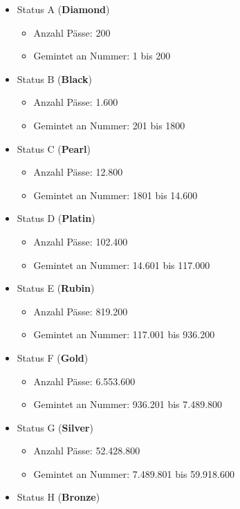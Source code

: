 \begin{NFT-Prop}
\begin{itemize}
    \item Status A (\textbf{Diamond})
    \begin{itemize}
    	\item Anzahl Pässe: 200
    	\item Gemintet an Nummer: 1 bis 200
    \end{itemize}
    \item Status B (\textbf{Black})
    \begin{itemize}
    	\item Anzahl Pässe: 1.600
    	\item Gemintet an Nummer: 201 bis 1800
    \end{itemize}
    \item Status C (\textbf{Pearl})
    \begin{itemize}
    	\item Anzahl Pässe: 12.800
    	\item Gemintet an Nummer: 1801 bis 14.600
    \end{itemize}
    \item Status D (\textbf{Platin})
    \begin{itemize}
    	\item Anzahl Pässe: 102.400
    	\item Gemintet an Nummer: 14.601 bis 117.000
    \end{itemize}
    \item Status E (\textbf{Rubin})
    \begin{itemize}
    	\item Anzahl Pässe: 819.200
    	\item Gemintet an Nummer: 117.001 bis 936.200
    \end{itemize}
    \item Status F (\textbf{Gold})
    \begin{itemize}
    	\item Anzahl Pässe: 6.553.600
    	\item Gemintet an Nummer: 936.201 bis 7.489.800
    \end{itemize}
    \item Status G (\textbf{Silver})
    \begin{itemize}
    	\item Anzahl Pässe: 52.428.800
    	\item Gemintet an Nummer: 7.489.801 bis 59.918.600
    \end{itemize}
    \item Status H (\textbf{Bronze})

\end{itemize}
\end{NFT-Prop}
